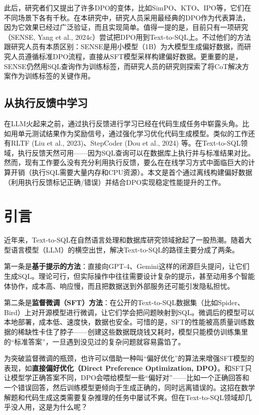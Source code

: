 此后，研究者们又提出了许多DPO的变体，比如SimPO、KTO、IPO等，它们在不同场景下各有千秋。在本研究中，研究人员采用最经典的DPO作为代表算法，因为它效果已经过广泛验证，而且实现简单。值得一提的是，目前只有一项研究（SENSE, Yang et al., 2024c）尝试把DPO用到Text-to-SQL上。不过他们的方法跟研究人员有本质区别：SENSE是用小模型（1B）为大模型生成偏好数据，而研究人员遵循标准DPO流程，直接从SFT模型采样构建偏好数据。更重要的是，SENSE仍然用SQL查询作为训练标签，而研究人员的研究则探索了将CoT解决方案作为训练标签的关键作用。

\subsection{从执行反馈中学习}
在LLM火起来之前，通过执行反馈进行学习已经在代码生成任务中崭露头角。比如用单元测试结果作为奖励信号，通过强化学习优化代码生成模型。类似的工作还有RLTF (Liu et al., 2023)、StepCoder (Dou et al., 2024) 等。在Text-to-SQL领域，执行反馈天然可用——因为SQL查询可以在数据库上执行并与标准结果对比。然而，现有工作要么没有充分利用执行反馈，要么在在线学习方式中面临巨大的计算开销（执行SQL需要大量内存和CPU资源）。本文是首个通过离线构建偏好数据（利用执行反馈标记正确/错误）并结合DPO实现稳定性能提升的工作。

\section{引言}

近年来，Text-to-SQL在自然语言处理和数据库研究领域掀起了一股热潮。随着大型语言模型（LLM）的横空出世，解决Text-to-SQL的路径主要分成了两条。

第一条是\textbf{基于提示的方法}：直接向GPT-4、Gemini这样的闭源巨头提问，让它们生成SQL。理论可行，但实际操作中往往需要设计复杂的提示，甚至动用多个智能体协作，成本高、响应慢，而且把数据送到外部服务还可能引发隐私担忧。

第二条是\textbf{监督微调（SFT）方法}：在公开的Text-to-SQL数据集（比如Spider、Bird）上对开源模型进行微调，让它们学会把问题映射到SQL。微调后的模型可以本地部署，成本低、速度快，数据也安全。可惜的是，SFT的性能被高质量训练数据的稀缺性卡住了脖子——创建这些数据既烧钱又耗时，模型只能模仿训练集里的“标准答案”，一旦遇到没见过的复杂问题就容易露馅了。

为突破监督微调的瓶颈，也许可以借助一种叫“偏好优化”的算法来增强SFT模型的表现，如\textbf{直接偏好优化（Direct Preference Optimization, DPO）}。和SFT只让模型学正确答案不同，DPO会喂给模型一些“偏好对”——比如一个正确回答和一个错误回答，然后训练模型更倾向于生成正确的，同时远离错误的。这招在数学解题和代码生成这类需要复杂推理的任务中屡试不爽。但在Text-to-SQL领域却几乎没人用，这是为什么呢？

